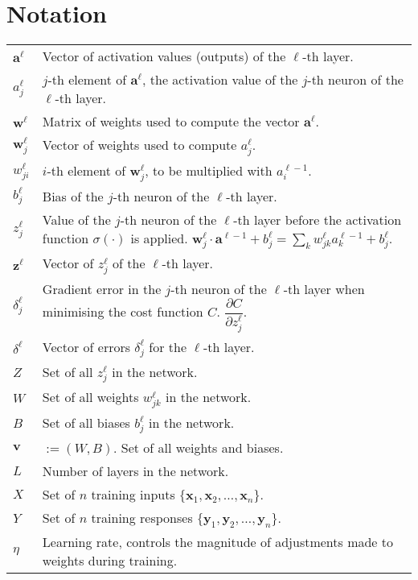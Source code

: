 \section*{Notation}

\begin{tabular}{p{1cm}p{13cm}}
$\mathbf{a}^\ell$ & Vector of activation values (outputs) of the $\ell$-th layer.\\
$a_j^\ell$ & $j$-th element of $\mathbf{a}^\ell$, the activation value of the $j$-th neuron of the $\ell$-th layer.\\
$\mathbf{w}^\ell$ & Matrix of weights used to compute the vector $\mathbf{a}^\ell$.\\
$\mathbf{w}^\ell_j$ & Vector of weights used to compute $a_j^\ell$.\\
$w_{ji}^\ell$ & $i$-th element of $\mathbf{w}^\ell_j$, to be multiplied with $a_i^{\ell-1}$.\\
$b_j^\ell$ & Bias of the $j$-th neuron of the $\ell$-th layer.\\
$z_j^\ell$ & Value of the $j$-th neuron of the $\ell$-th layer before the activation function $\sigma(\cdot)$ is applied. $\mathbf{w}_j^\ell\cdot \mathbf{a}^{\ell-1} + b_j^\ell= \sum_k w_{jk}^\ell a_k^{\ell-1} + b_j^\ell$.\\
$\mathbf{z}^\ell$ & Vector of $z_j^\ell$ of the $\ell$-th layer.\\
$\delta_j^\ell$ & Gradient error in the $j$-th neuron of the $\ell$-th layer when minimising the cost function $C$. $\dfrac{\partial C}{\partial z_j^\ell}$.\\
$\delta^\ell$ & Vector of errors $\delta_j^\ell$ for the $\ell$-th layer.\\
$Z$ & Set of all $z_j^\ell$ in the network. \\
$W$ & Set of all weights $w_{jk}^\ell$ in the network.\\
$B$ & Set of all biases $b_j^\ell$ in the network. \\
$\mathbf{v}$ & $:= (W,B)$. Set of all weights and biases.\\
$L$ & Number of layers in the network.\\
$X$ & Set of $n$ training inputs $\{\mathbf{x}_1, \mathbf{x}_2, \ldots, \mathbf{x}_n\}$. \\
$Y$ & Set of $n$ training responses $\{\mathbf{y}_1, \mathbf{y}_2, \ldots, \mathbf{y}_n\}$.\\
$\eta$ & Learning rate, controls the magnitude of adjustments made to weights during training.
\end{tabular}